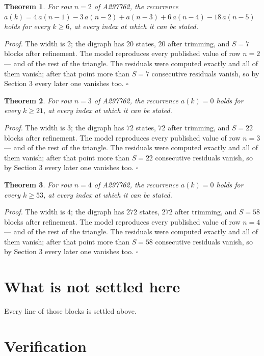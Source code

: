 \documentclass[11pt]{article}
\newtheorem{theorem}{Theorem}
\theoremstyle{definition}
\begin{document}
\begin{theorem} For row $n = 2$ of A297762, the recurrence $a(k) = 4\,a(n-1) - 3\,a(n-2) + a(n-3) + 6\,a(n-4) - 18\,a(n-5)$ holds for every $k \ge 6$, at every index at which it can be stated.\end{theorem}

{\itshape Proof.} The width is $2$; the digraph has $20$ states, $20$ after trimming, and $S = 7$ blocks after refinement. The model reproduces every published value of row $n = 2$ --- and of the rest of the triangle. The residuals were computed exactly and all of them vanish; after that point more than $S = 7$ consecutive residuals vanish, so by Section 3 every later one vanishes too. $\square$

\begin{theorem} For row $n = 3$ of A297762, the recurrence $a(k) = 0$ holds for every $k \ge 21$, at every index at which it can be stated.\end{theorem}

{\itshape Proof.} The width is $3$; the digraph has $72$ states, $72$ after trimming, and $S = 22$ blocks after refinement. The model reproduces every published value of row $n = 3$ --- and of the rest of the triangle. The residuals were computed exactly and all of them vanish; after that point more than $S = 22$ consecutive residuals vanish, so by Section 3 every later one vanishes too. $\square$

\begin{theorem} For row $n = 4$ of A297762, the recurrence $a(k) = 0$ holds for every $k \ge 53$, at every index at which it can be stated.\end{theorem}

{\itshape Proof.} The width is $4$; the digraph has $272$ states, $272$ after trimming, and $S = 58$ blocks after refinement. The model reproduces every published value of row $n = 4$ --- and of the rest of the triangle. The residuals were computed exactly and all of them vanish; after that point more than $S = 58$ consecutive residuals vanish, so by Section 3 every later one vanishes too. $\square$

\section{What is not settled here}

Every line of those blocks is settled above.

\section{Verification}
\end{document}
